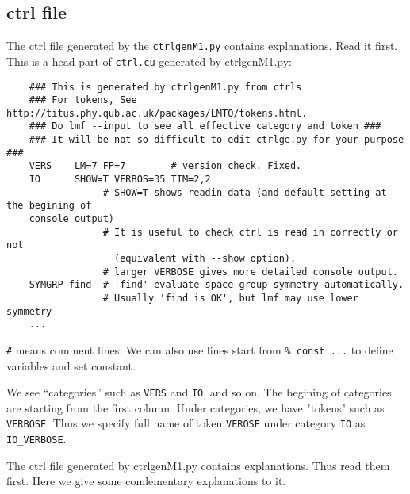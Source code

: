 \documentclass[a4paper,10pt,epsf,fleqn]{article}
\begin{document}
\subsection{ctrl file}
The ctrl file generated by the \verb+ctrlgenM1.py+ contains explanations. 
Read it first. This is a head part of \verb+ctrl.cu+ generated by ctrlgenM1.py:
\begin{verbatim}
    ### This is generated by ctrlgenM1.py from ctrls 
    ### For tokens, See http://titus.phy.qub.ac.uk/packages/LMTO/tokens.html. 
    ### Do lmf --input to see all effective category and token ###
    ### It will be not so difficult to edit ctrlge.py for your purpose ###
    VERS    LM=7 FP=7        # version check. Fixed.
    IO      SHOW=T VERBOS=35 TIM=2,2
                 # SHOW=T shows readin data (and default setting at the begining of 
    console output)
                 # It is useful to check ctrl is read in correctly or not
                   (equivalent with --show option).
                 # larger VERBOSE gives more detailed console output.
    SYMGRP find  # 'find' evaluate space-group symmetry automatically.
                 # Usually 'find is OK', but lmf may use lower symmetry
    ...
\end{verbatim}
\verb+#+ means comment lines. We can also use
lines start from \verb+% const ...+ to define variables and set constant.

We see ``categories'' such as \verb+VERS+ and \verb+IO+, and so on.
The begining of categories are starting from the first column.
Under categories, we have "tokens" such as \verb+VERBOSE+.
Thus we specify full name of token \verb+VEROSE+ under category
\verb+IO+ as \verb+IO_VERBOSE+.

The ctrl file generated by ctrlgenM1.py contains explanations.
Thus read them first. Here we give some comlementary explanations to it.
\end{document}
